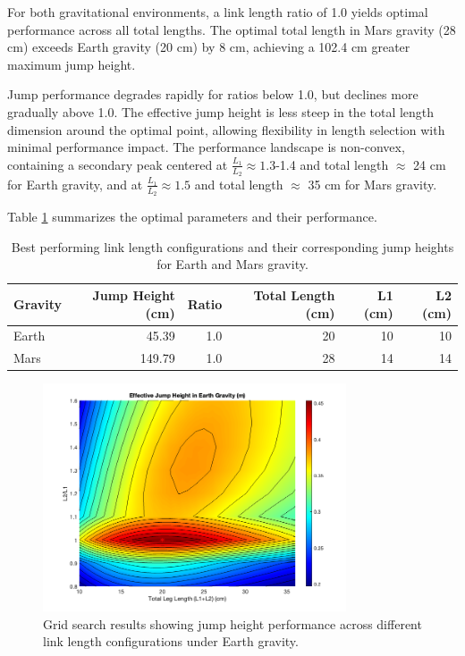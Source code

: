 For both gravitational environments, a link length ratio of 1.0 yields optimal performance across all total lengths. The optimal total length in Mars gravity (28 cm) exceeds Earth gravity (20 cm) by 8 cm, achieving a 102.4 cm greater maximum jump height.

Jump performance degrades rapidly for ratios below 1.0, but declines more gradually above 1.0. The effective jump height is less steep in the total length dimension around the optimal point, allowing flexibility in length selection with minimal performance impact. The performance landscape is non-convex, containing a secondary peak centered at \(\frac{L_1}{L_2} \approx 1.3\)-1.4 and total length $\approx$ 24 cm for Earth gravity, and at \(\frac{L_1}{L_2} \approx 1.5\) and total length $\approx$ 35 cm for Mars gravity.

Table \ref{tab:results:grid_search:best_jumps} summarizes the optimal parameters and their performance.
\begin{table}[h]

    \centering
    \begin{tabular}{lrrrrr}
        \hline
        Gravity & Jump Height (cm) & Ratio & Total Length (cm) & L1 (cm) & L2 (cm) \\
        \hline
        Earth & 45.39 & 1.0 & 20 & 10 & 10 \\
        Mars & 149.79 & 1.0 & 28 & 14 & 14 \\
        \hline
    \end{tabular}
    \caption{Best performing link length configurations and their corresponding jump heights for Earth and Mars gravity.}
    \label{tab:results:grid_search:best_jumps}
\end{table}


\begin{figure}[h]
    \centering
    \includegraphics[width=0.8\textwidth]{Images/results/grid_search_earth.png}
    \caption{Grid search results showing jump height performance across different link length configurations under Earth gravity.}
    \label{fig:results:grid_search_earth}
\end{figure}



